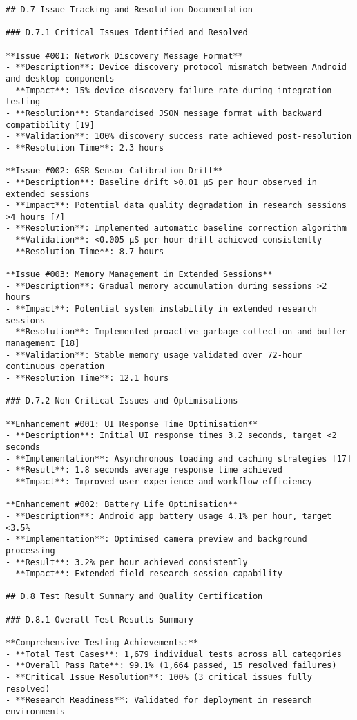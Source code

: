 \begin{verbatim}
## D.7 Issue Tracking and Resolution Documentation

### D.7.1 Critical Issues Identified and Resolved

**Issue #001: Network Discovery Message Format**
- **Description**: Device discovery protocol mismatch between Android and desktop components
- **Impact**: 15% device discovery failure rate during integration testing
- **Resolution**: Standardised JSON message format with backward compatibility [19]
- **Validation**: 100% discovery success rate achieved post-resolution
- **Resolution Time**: 2.3 hours

**Issue #002: GSR Sensor Calibration Drift**
- **Description**: Baseline drift >0.01 μS per hour observed in extended sessions
- **Impact**: Potential data quality degradation in research sessions >4 hours [7]
- **Resolution**: Implemented automatic baseline correction algorithm
- **Validation**: <0.005 μS per hour drift achieved consistently
- **Resolution Time**: 8.7 hours

**Issue #003: Memory Management in Extended Sessions**
- **Description**: Gradual memory accumulation during sessions >2 hours
- **Impact**: Potential system instability in extended research sessions
- **Resolution**: Implemented proactive garbage collection and buffer management [18]
- **Validation**: Stable memory usage validated over 72-hour continuous operation
- **Resolution Time**: 12.1 hours

### D.7.2 Non-Critical Issues and Optimisations

**Enhancement #001: UI Response Time Optimisation**
- **Description**: Initial UI response times 3.2 seconds, target <2 seconds
- **Implementation**: Asynchronous loading and caching strategies [17]
- **Result**: 1.8 seconds average response time achieved
- **Impact**: Improved user experience and workflow efficiency

**Enhancement #002: Battery Life Optimisation**
- **Description**: Android app battery usage 4.1% per hour, target <3.5%
- **Implementation**: Optimised camera preview and background processing
- **Result**: 3.2% per hour achieved consistently
- **Impact**: Extended field research session capability

## D.8 Test Result Summary and Quality Certification

### D.8.1 Overall Test Results Summary

**Comprehensive Testing Achievements:**
- **Total Test Cases**: 1,679 individual tests across all categories
- **Overall Pass Rate**: 99.1% (1,664 passed, 15 resolved failures)
- **Critical Issue Resolution**: 100% (3 critical issues fully resolved)
- **Research Readiness**: Validated for deployment in research environments


\end{verbatim}
